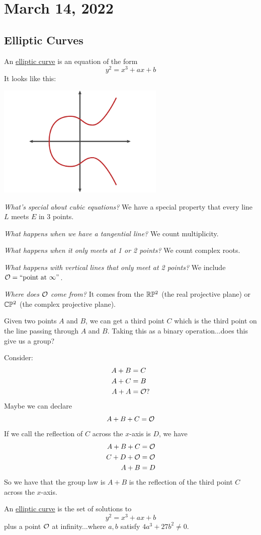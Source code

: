 \section{March 14, 2022}
\subsection{Elliptic Curves}
An \ul{elliptic curve} is an equation of the form
\[y^2 = x^3 + ax + b\]
It looks like this:
\begin{center}
    \includegraphics[width=0.6\textwidth]{images/elliptic_curve.png}
\end{center}

\emph{What's special about cubic equations?} We have a special property that every line $L$ meets $E$ in 3 points.

\emph{What happens when we have a tangential line?} We count multiplicity.

\emph{What happens when it only meets at 1 or 2 points?} We count complex roots.

\emph{What happens with vertical lines that only meet at 2 points?} We include $\mathcal{O} = \text{``point at $\infty$''}$.

\emph{Where does $\mathcal{O}$ come from?} It comes from the $\mathbb R\mathbb{P}^2$ (the real projective plane) or $\mathbb C\mathbb{P}^2$ (the complex projective plane).

Given two points $A$ and $B$, we can get a third point $C$ which is the third point on the line passing through $A$ and $B$. Taking this as a binary operation...does this give us a group?

Consider:
\begin{align*}
    A + B & = C           \\
    A + C & = B           \\
    A + A & = \mathcal{O}\text{?}
\end{align*}
Maybe we can declare
\[A + B + C = \mathcal{O}\]
If we call the reflection of $C$ across the $x$-axis is $D$, we have
\begin{align*}
    A + B + C   & = \mathcal{O} \\
    C + D + \mathcal{O} & = \mathcal{O} \\
    A + B       & = D
\end{align*}
So we have that the group law is $A + B$ is the reflection of the third point $C$ across the $x$-axis.
\begin{definition}
    An \ul{elliptic curve} is the set of solutions to
    \[y^2 = x^3 + ax + b\]
    plus a point $\mathcal{O}$ at infinity...where $a, b$ satisfy $4a^3 + 27b^2\neq 0$.
\end{definition}

